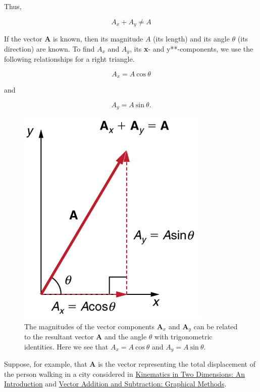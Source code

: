 \documentclass[
]{book}
\begin{document}
Thus,

\leavevmode{}%
\[{{A_{x} + A_{y}} \neq A}{}\]

If the vector \(\mathbf{A}{}\) is known, then its magnitude \(A{}\) (its
length) and its angle \(\theta{}\) (its direction) are known. To find
\(A_{x}{}\)\emph{} and
\emph{}\(A_{y}{}\), its \textbf{x}- and
\emph{}y**-components, we use the following
relationships for a right triangle.

\leavevmode{}%
\[{{A_{x} = A}\ \text{cos}\ \theta}{}\]

and

\leavevmode{}%
\[{{A_{y} = A}\ \text{sin}\ \theta}\text{.}{}\]

\begin{figure}
\hypertarget{import-auto-id1165298704788}{%
\centering
\includegraphics{images/Figure_03_03_02a.jpg}
\caption{The magnitudes of the vector components \(\mathbf{A}_{x}{}\) and
\(\mathbf{A}_{y}{}\) can be related to the resultant vector \(\mathbf{A}{}\)
and the angle \(\theta{}\) with trigonometric identities. Here we see that
\({{A_{x} = A}\ \text{cos}\ \theta}{}\) and
\({{A_{y} = A}\ \text{sin}\ \theta}{}\).}\label{import-auto-id1165298704788}
}
\end{figure}

Suppose, for example, that \(\mathbf{A}{}\) is the vector representing the
total displacement of the person walking in a city considered in
\href{/m54779}{Kinematics in Two Dimensions: An Introduction} and \href{/m54781}{Vector
Addition and Subtraction: Graphical Methods}.
\end{document}
